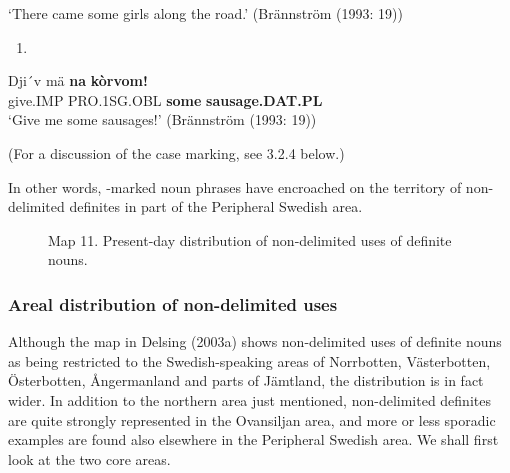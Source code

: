 ‘There came some girls along the road.’ (Brännström (1993: 19))
\z

\begin{enumerate} %
\item 
\end{enumerate} %
\ea\label{}
\gll Dji´v  mä  \textbf{na}\textbf{  kòrvom!}\\


give.IMP  PRO.1SG.OBL  \textbf{some} \textbf{sausage.DAT.PL}\\ %


‘Give me some sausages!’ (Brännström (1993: 19))
\z

(For a discussion of the case marking, see 3.2.4 below.) 

In other words, -marked noun phrases have encroached on the territory of non-delimited definites in part of the Peripheral Swedish area. 

\clearpage%



\begin{figure}[h]
\centering
\begin{minipage}{5.30556in}
Map 11. Present-day distribution of non-delimited uses of definite nouns.
\end{minipage}
\end{figure}
\clearpage\subsubsection[Areal distribution of non{}-delimited uses]{\rmfamily Areal distribution of non-delimited uses}
Although the map in Delsing (2003a) shows non-delimited uses of definite nouns as being restricted to the Swedish-speaking areas of Norrbotten, Västerbotten, Österbotten, Ångermanland and parts of Jämtland, the distribution is in fact wider. In addition to the northern area just mentioned, non-delimited definites are quite strongly represented in the Ovansiljan area, and more or less sporadic examples are found also elsewhere in the Peripheral Swedish area. We shall first look at the two core areas.

